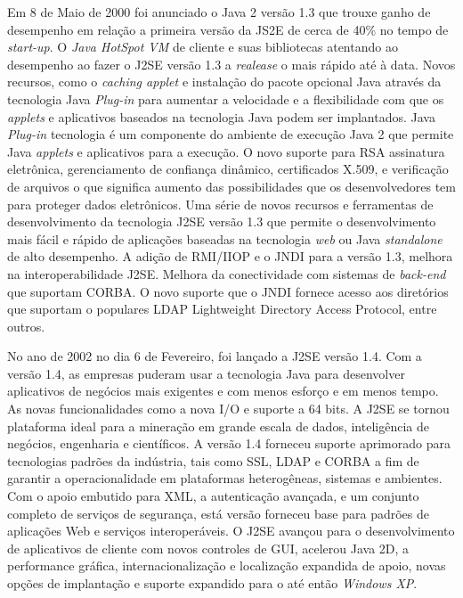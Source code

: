 Em 8 de Maio de 2000 foi anunciado o Java 2 versão 1.3 que trouxe ganho de desempenho em relação a primeira versão da JS2E de cerca de 40\%  no tempo de {\it  start-up}. O {\it Java HotSpot VM} de cliente e suas bibliotecas atentando ao desempenho ao fazer o J2SE versão 1.3 a {\it realease} o mais rápido até à data. Novos recursos, como o {\it caching applet} e instalação do pacote opcional Java através da tecnologia Java {\it  Plug-in} para aumentar a velocidade e a flexibilidade com que os {\it applets} e aplicativos baseados na tecnologia Java podem ser implantados. Java {\it  Plug-in} tecnologia é um componente do ambiente de execução Java 2 que permite Java {\it applets} e aplicativos para a execução. O novo suporte para \acs{RSA} assinatura eletrônica, gerenciamento de confiança dinâmico, certificados X.509, e verificação de arquivos o que significa aumento das possibilidades que os desenvolvedores tem para proteger dados eletrônicos. Uma série de novos recursos e ferramentas de desenvolvimento da tecnologia J2SE versão 1.3 que permite o desenvolvimento mais fácil e rápido de aplicações baseadas na tecnologia {\it web} ou Java {\it  standalone} de alto desempenho. A adição de RMI/IIOP e o JNDI para a versão 1.3, melhora na interoperabilidade J2SE. Melhora da conectividade com sistemas de {\it  back-end} que suportam CORBA. O novo suporte que o JNDI fornece acesso aos diretórios que suportam o populares LDAP Lightweight Directory Access Protocol, entre outros.


No ano de 2002 no dia 6 de Fevereiro, foi lançado a J2SE versão 1.4. Com a versão 1.4, as empresas puderam usar a tecnologia Java para desenvolver aplicativos de negócios mais exigentes e com menos esforço e em menos tempo. As novas funcionalidades como a nova I/O e suporte a 64 bits. A J2SE se tornou plataforma ideal para a mineração em grande escala de dados, inteligência de negócios, engenharia e científicos. A versão 1.4 forneceu suporte aprimorado para tecnologias padrões da indústria, tais como SSL, LDAP e CORBA a fim de garantir a operacionalidade em plataformas heterogêneas, sistemas e ambientes. Com o apoio embutido para XML, a autenticação avançada, e um conjunto completo de serviços de segurança, está versão forneceu base para padrões de aplicações Web e serviços interoperáveis. O J2SE avançou para o desenvolvimento de aplicativos de cliente com novos controles de GUI, acelerou Java 2D, a performance gráfica, internacionalização e localização expandida de apoio, novas opções de implantação e suporte expandido para o até então {\it Windows XP}.

